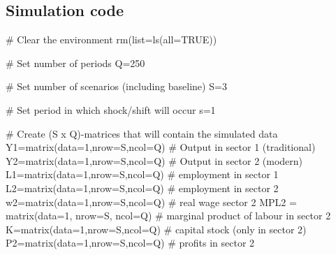 \documentclass[
  letterpaper,
  DIV=11,
  numbers=noendperiod]{scrreprt}
\newenvironment{Shaded}{\begin{snugshade}}{\end{snugshade}}
\newcommand{\AttributeTok}[1]{\textcolor[rgb]{0.40,0.45,0.13}{#1}}
\newcommand{\CommentTok}[1]{\textcolor[rgb]{0.37,0.37,0.37}{#1}}
\newcommand{\ConstantTok}[1]{\textcolor[rgb]{0.56,0.35,0.01}{#1}}
\newcommand{\DecValTok}[1]{\textcolor[rgb]{0.68,0.00,0.00}{#1}}
\newcommand{\FunctionTok}[1]{\textcolor[rgb]{0.28,0.35,0.67}{#1}}
\newcommand{\NormalTok}[1]{\textcolor[rgb]{0.00,0.23,0.31}{#1}}
\newcommand{\OtherTok}[1]{\textcolor[rgb]{0.00,0.23,0.31}{#1}}
\begin{document}
\subsection{Simulation code}\label{simulation-code-12}

\begin{Shaded}
\begin{Highlighting}[]
\CommentTok{\# Clear the environment}
\FunctionTok{rm}\NormalTok{(}\AttributeTok{list=}\FunctionTok{ls}\NormalTok{(}\AttributeTok{all=}\ConstantTok{TRUE}\NormalTok{))}

\CommentTok{\# Set number of periods}
\NormalTok{Q}\OtherTok{=}\DecValTok{250}

\CommentTok{\# Set number of scenarios (including baseline)}
\NormalTok{S}\OtherTok{=}\DecValTok{3}

\CommentTok{\# Set period in which shock/shift will occur}
\NormalTok{s}\OtherTok{=}\DecValTok{1}

\CommentTok{\# Create (S x Q){-}matrices that will contain the simulated data}
\NormalTok{Y1}\OtherTok{=}\FunctionTok{matrix}\NormalTok{(}\AttributeTok{data=}\DecValTok{1}\NormalTok{,}\AttributeTok{nrow=}\NormalTok{S,}\AttributeTok{ncol=}\NormalTok{Q) }\CommentTok{\# Output in sector 1 (traditional)}
\NormalTok{Y2}\OtherTok{=}\FunctionTok{matrix}\NormalTok{(}\AttributeTok{data=}\DecValTok{1}\NormalTok{,}\AttributeTok{nrow=}\NormalTok{S,}\AttributeTok{ncol=}\NormalTok{Q) }\CommentTok{\# Output in sector 2 (modern)}
\NormalTok{L1}\OtherTok{=}\FunctionTok{matrix}\NormalTok{(}\AttributeTok{data=}\DecValTok{1}\NormalTok{,}\AttributeTok{nrow=}\NormalTok{S,}\AttributeTok{ncol=}\NormalTok{Q) }\CommentTok{\# employment in sector 1}
\NormalTok{L2}\OtherTok{=}\FunctionTok{matrix}\NormalTok{(}\AttributeTok{data=}\DecValTok{1}\NormalTok{,}\AttributeTok{nrow=}\NormalTok{S,}\AttributeTok{ncol=}\NormalTok{Q) }\CommentTok{\# employment in sector 2}
\NormalTok{w2}\OtherTok{=}\FunctionTok{matrix}\NormalTok{(}\AttributeTok{data=}\DecValTok{1}\NormalTok{,}\AttributeTok{nrow=}\NormalTok{S,}\AttributeTok{ncol=}\NormalTok{Q) }\CommentTok{\# real wage sector 2}
\NormalTok{MPL2 }\OtherTok{=} \FunctionTok{matrix}\NormalTok{(}\AttributeTok{data=}\DecValTok{1}\NormalTok{, }\AttributeTok{nrow=}\NormalTok{S, }\AttributeTok{ncol=}\NormalTok{Q) }\CommentTok{\# marginal product of labour in sector 2}
\NormalTok{K}\OtherTok{=}\FunctionTok{matrix}\NormalTok{(}\AttributeTok{data=}\DecValTok{1}\NormalTok{,}\AttributeTok{nrow=}\NormalTok{S,}\AttributeTok{ncol=}\NormalTok{Q) }\CommentTok{\# capital stock (only in sector 2)}
\NormalTok{P2}\OtherTok{=}\FunctionTok{matrix}\NormalTok{(}\AttributeTok{data=}\DecValTok{1}\NormalTok{,}\AttributeTok{nrow=}\NormalTok{S,}\AttributeTok{ncol=}\NormalTok{Q) }\CommentTok{\#  profits in sector 2}


\end{Highlighting}
\end{Shaded}
\end{document}
